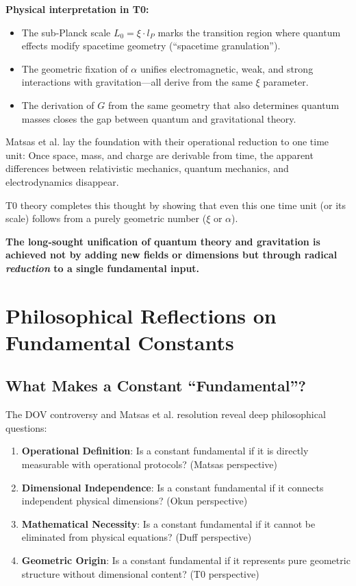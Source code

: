 	\textbf{Physical interpretation in T0:}
	
	\begin{itemize}
		\item The sub-Planck scale $L_0 = \xi \cdot l_P$ marks the transition region where quantum effects modify spacetime geometry (``spacetime granulation'').
		
		\item The geometric fixation of $\alpha$ unifies electromagnetic, weak, and strong interactions with gravitation—all derive from the same $\xi$ parameter.
		
		\item The derivation of $G$ from the same geometry that also determines quantum masses closes the gap between quantum and gravitational theory.
	\end{itemize}
	
	Matsas et al. lay the foundation with their operational reduction to one time unit: Once space, mass, and charge are derivable from time, the apparent differences between relativistic mechanics, quantum mechanics, and electrodynamics disappear.
	
	T0 theory completes this thought by showing that even this one time unit (or its scale) follows from a purely geometric number ($\xi$ or $\alpha$).
	
	\textbf{The long-sought unification of quantum theory and gravitation is achieved not by adding new fields or dimensions but through radical \emph{reduction} to a single fundamental input.}
	
	\section{Philosophical Reflections on Fundamental Constants}
	
	\subsection{What Makes a Constant ``Fundamental''?}
	
	The DOV controversy and Matsas et al. resolution reveal deep philosophical questions:
	
	\begin{enumerate}
		\item \textbf{Operational Definition}: Is a constant fundamental if it is directly measurable with operational protocols? (Matsas perspective)
		
		\item \textbf{Dimensional Independence}: Is a constant fundamental if it connects independent physical dimensions? (Okun perspective)
		
		\item \textbf{Mathematical Necessity}: Is a constant fundamental if it cannot be eliminated from physical equations? (Duff perspective)
		
		\item \textbf{Geometric Origin}: Is a constant fundamental if it represents pure geometric structure without dimensional content? (T0 perspective)
	\end{enumerate}
	
